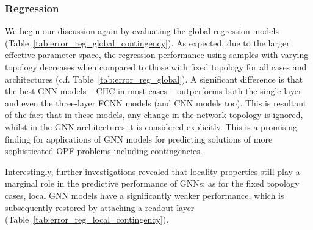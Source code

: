 \documentclass[journal]{IEEEtran}
\begin{document}
\subsubsection{Regression}
We begin our discussion again by evaluating the global regression models (Table~\ref{tab:error_reg_global_contingency}). As expected, due to the larger effective parameter space, the regression performance using samples with varying topology decreases when compared to those with fixed topology for all cases and architectures (c.f. Table~\ref{tab:error_reg_global}).
A significant difference is that the best GNN models -- CHC in most cases -- outperforms both the single-layer and even the three-layer FCNN models (and CNN models too). This is resultant of the fact that in these models, any change in the network topology is ignored, whilst in the GNN architectures it is considered explicitly. This is a promising finding for applications of GNN models for predicting solutions of more sophisticated OPF problems including contingencies.

Interestingly, further investigations revealed that locality properties still play a marginal role in the predictive performance of GNNs: as for the fixed topology cases, local GNN models have a significantly weaker performance, which is subsequently restored by attaching a readout layer (Table~\ref{tab:error_reg_local_contingency}).
\end{document}
